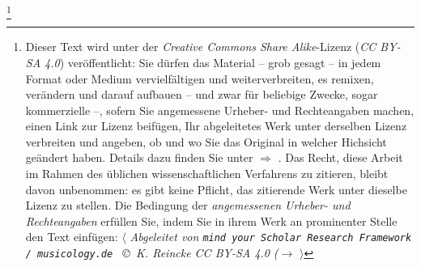 %
%
%
\footnote{Dieser Text wird unter der \textit{Creative Commons Share
Alike}-Lizenz (\textit{CC BY-SA 4.0}) ver\-öffentlicht: Sie dürfen das Material
-- grob gesagt -- in jedem Format oder Medium vervielfältigen und
weiterverbreiten, es remixen, verändern und darauf aufbauen -- und zwar für
beliebige Zwecke, sogar kommerzielle --, sofern Sie angemessene Urheber- und
Rechteangaben machen, einen Link zur Lizenz beifügen, Ihr abgeleitetes Werk
unter derselben Lizenz verbreiten und angeben, ob und wo Sie das Original in
welcher Hichsicht geändert haben. Details dazu finden Sie unter $\Rightarrow$
.
Das Recht, diese Arbeit im Rahmen des üblichen wissenschaftlichen Verfahrens zu
zitieren, bleibt davon unbenommen: es gibt keine Pflicht, das zitierende Werk
unter dieselbe Lizenz zu stellen. Die Bedingung der \textit{an\-ge\-mes\-se\-nen
Urheber- und Rechteangaben} erfüllen Sie, indem Sie in ihrem Werk an prominenter
Stelle den Text einfügen: $\langle$ {\itshape Abgeleitet von \texttt{mind your
Scholar Research Framework / musicology.de } \copyright\ K. Reincke CC BY-SA 4.0
($\rightarrow$
 }
$\rangle$ }

